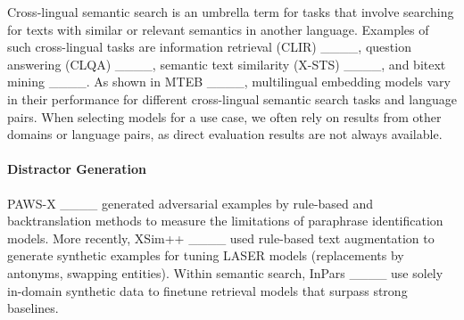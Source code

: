 Cross-lingual semantic search is an umbrella term for tasks that involve searching for texts with similar or relevant semantics in another language. Examples of such cross-lingual tasks are information retrieval (CLIR) ____, question answering (CLQA) ____, semantic text similarity (X-STS) ____, and bitext mining ____. As shown in MTEB ____, multilingual embedding models vary in their performance for different cross-lingual semantic search tasks and language pairs. When selecting models for a use case, we often rely on results from other domains or language pairs, as direct evaluation results are not always available.

\paragraph{\textbf{Distractor Generation}}

PAWS-X ____ generated adversarial examples by rule-based and backtranslation methods to measure the limitations of paraphrase identification models.  More recently, XSim++ ____ used rule-based text augmentation to generate synthetic examples for tuning LASER models (replacements by antonyms, swapping entities). Within semantic search, InPars ____ use solely in-domain synthetic data to finetune retrieval models that surpass strong baselines.


